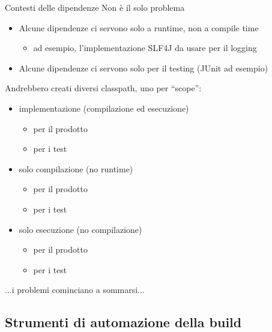 \documentclass[xcolor=dvipsnames,presentation]{beamer}
\begin{document}
\begin{frame}[fragile]{Contesti delle dipendenze}
    Non è il solo problema
    \begin{itemize}
        \item Alcune dipendenze ci servono solo a runtime, non a compile time
        	\begin{itemize}
        	\item ad esempio, l'implementazione SLF4J da usare per il logging
        	\end{itemize}
        \item Alcune dipendenze ci servono solo per il testing (JUnit ad esempio)
    \end{itemize}
    Andrebbero creati diversi classpath, uno per ``scope'':
    \begin{itemize}
        \item implementazione (compilazione ed esecuzione)
        \begin{itemize}
            \item per il prodotto
            \item per i test
        \end{itemize}
        \item solo compilazione (no runtime)
        \begin{itemize}
            \item per il prodotto
            \item per i test
        \end{itemize}
        \item solo esecuzione (no compilazione)
        \begin{itemize}
            \item per il prodotto
            \item per i test
        \end{itemize}
    \end{itemize}
    ...i problemi cominciano a sommarsi...
\end{frame}

\subsection{Strumenti di automazione della build}
\end{document}

